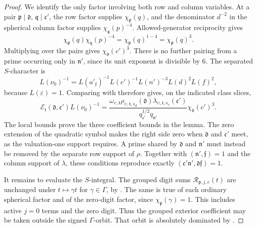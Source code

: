 \begin{proof}
We identify the only factor involving both row and column variables.
At a pair \(\mathfrak p\mid\mathfrak d\),
\(\mathfrak q\mid\mathfrak c'\), the row factor supplies
\(\chi_{\mathfrak p}(q)\), and the denominator \(d^{-2}\) in the
spherical column factor supplies \(\chi_{\mathfrak q}(p)^{-4}\).
Allowed-generator reciprocity gives
\begin{equation}\label{eq:reflection-one-minus-four}
 \chi_{\mathfrak p}(q)\chi_{\mathfrak q}(p)^{-4}
      =\chi_{\mathfrak p}(q)^{1-4}
      =\chi_{\mathfrak p}(q)^3.
\end{equation}
Multiplying over the pairs gives \(\chi_{\mathfrak d}(c')^3\).
There is no further pairing from a prime occurring only in
\(\mathfrak n'\), since its unit exponent is divisible by \(6\).
The separated \(S\)-character is
\[
 L(\nu_0)^{-1}
  =L(a'_{\mathfrak f})^{-1}L(c')^{-1}L(n')^{-3}L(d)^2L(f)^2,
\]
because \(L(\varepsilon)=1\).  Comparing
 with
therefore gives, on the indicated class slices,
\begin{equation}\label{eq:reflection-factor-separation}
 \mathcal E_{\mathfrak t}(\mathfrak d,\mathfrak c')L(\nu_0)^{-1}
  =\frac{\omega_{\upsilon,\mathfrak t}
          \rho_{\upsilon,\mathfrak t,s_d}(\mathfrak d)
          \lambda_{\upsilon,\mathfrak t,s_c}(\mathfrak c')}
         {q_{\mathfrak c'}^{1/2}q_{\mathfrak n'}}
       \chi_{\mathfrak d}(c')^3.
\end{equation}
The local bounds prove the three coefficient bounds in the lemma.
The zero extension of the quadratic symbol makes the right side zero
when \(\mathfrak d\) and \(\mathfrak c'\) meet, as the valuation-one
support requires.  A prime shared by \(\mathfrak d\) and \(\mathfrak n'\)
must instead be removed by the separate row support of \(\rho\).
Together with \((\mathfrak n',\mathfrak f)=1\) and the column support of
\(\lambda\), these conditions reproduce exactly
\((\mathfrak c'\mathfrak n',\mathfrak d\mathfrak f)=1\).

It remains to evaluate the \(S\)-integral.  The grouped digit sums
\(\mathcal R_{\mathfrak p,j,e}(t)\) are unchanged under \(t\mapsto\gamma t\)
for \(\gamma\in\Gamma\), by .
The same is true of each ordinary spherical factor and of the zero-digit
factor, since \(\chi_{\mathfrak p}(\gamma)=1\).  This includes active
\(j=0\) terms and the zero digit.  Thus the grouped exterior coefficient
may be taken outside the signed \(\Gamma\)-orbit.  That orbit is absolutely
dominated by .


\end{proof}
